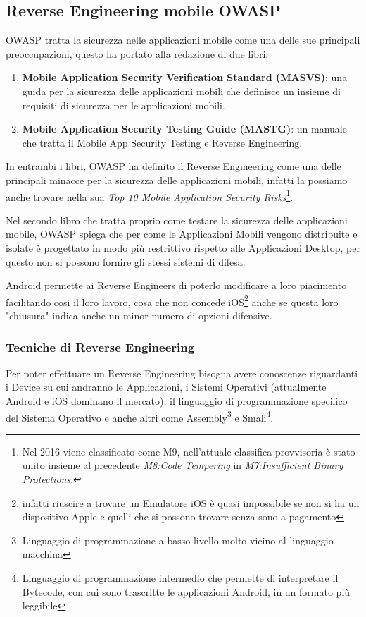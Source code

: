 \documentclass{article}
\begin{document}
\subsection{Reverse Engineering mobile OWASP}
OWASP tratta la sicurezza nelle applicazioni mobile come una delle sue principali preoccupazioni, questo ha portato alla redazione di due libri:
\begin{enumerate}
    \item \textbf{Mobile Application Security Verification Standard (MASVS)}: una guida per la sicurezza delle applicazioni mobili che 
    definisce un insieme di requisiti di sicurezza per le applicazioni mobili.\cite{MASVS}
    \item \textbf{Mobile Application Security Testing Guide (MASTG)}: un manuale che tratta il Mobile App Security 
    Testing e Reverse Engineering.\cite{MASTG}
\end{enumerate}

In entrambi i libri, OWASP ha definito il Reverse Engineering come una delle principali minacce per la sicurezza delle applicazioni 
mobili, infatti la possiamo anche trovare nella sua  
\textit{Top 10 Mobile Application Security Risks}\footnote{Nel 2016 viene classificato come M9, nell'attuale 
classifica provvisoria è stato unito insieme al precedente \textit{M8:Code Tempering} 
in \textit{M7:Insufficient Binary Protections}.\cite{owasp2016}\cite{owasp2023}}.


Nel secondo libro che tratta proprio come testare la sicurezza delle applicazioni mobile, OWASP spiega che per come le Applicazioni Mobili
vengono distribuite e isolate è progettato in modo più restrittivo rispetto alle Applicazioni Desktop, per questo non si possono fornire
gli stessi sistemi di difesa. 

Android permette ai Reverse Engineers di poterlo modificare a loro piacimento facilitando cosi il loro 
lavoro, cosa che non concede iOS\footnote{infatti riuscire a trovare un Emulatore iOS è quasi impossibile se non si ha un 
dispositivo Apple e quelli che si possono trovare senza sono a pagamento} anche se questa loro "chiusura" indica anche un minor numero di 
opzioni difensive.


\subsubsection{Tecniche di Reverse Engineering}
Per poter effettuare un Reverse Engineering bisogna avere conoscenze riguardanti i Device su cui andranno le Applicazioni,
 i Sistemi Operativi (attualmente Android e iOS dominano il mercato), il 
linguaggio di programmazione specifico del Sistema Operativo e anche altri come Assembly\footnote{Linguaggio di 
programmazione a basso livello molto vicino al linguaggio macchina\cite{Assembly}} e Smali\footnote{Linguaggio di programmazione
intermedio che permette di interpretare il Bytecode, con cui sono trascritte le applicazioni Android, in un formato più leggibile\cite{smali}}.
\end{document}
